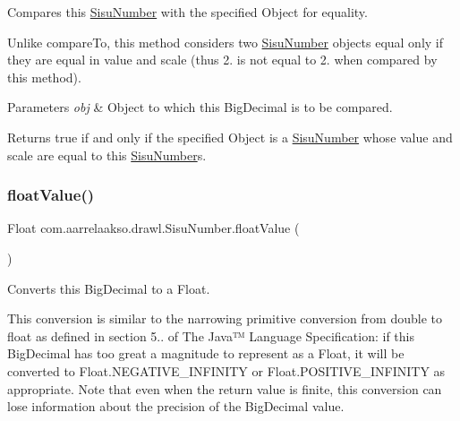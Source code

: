 Compares this \hyperlink{classcom_1_1aarrelaakso_1_1drawl_1_1_sisu_number}{Sisu\+Number} with the specified Object for equality. 

Unlike compare\+To, this method considers two \hyperlink{classcom_1_1aarrelaakso_1_1drawl_1_1_sisu_number}{Sisu\+Number} objects equal only if they are equal in value and scale (thus 2. is not equal to 2. when compared by this method).


\begin{DoxyParams}{Parameters}
{\em obj} & Object to which this Big\+Decimal is to be compared. \\
\hline
\end{DoxyParams}
\begin{DoxyReturn}{Returns}
true if and only if the specified Object is a \hyperlink{classcom_1_1aarrelaakso_1_1drawl_1_1_sisu_number}{Sisu\+Number} whose value and scale are equal to this \hyperlink{classcom_1_1aarrelaakso_1_1drawl_1_1_sisu_number}{Sisu\+Number}\textquotesingle{}s. 
\end{DoxyReturn}
\mbox{\label{classcom_1_1aarrelaakso_1_1drawl_1_1_sisu_number_a4c7db66d6d3016a3d10a1664b43117b9}} 
\subsubsection{\texorpdfstring{float\+Value()}{floatValue()}}
{\footnotesize\ttfamily Float com.\+aarrelaakso.\+drawl.\+Sisu\+Number.\+float\+Value (\begin{DoxyParamCaption}{ }\end{DoxyParamCaption})\hspace{0.3cm}{\ttfamily [protected]}}



Converts this Big\+Decimal to a Float. 

This conversion is similar to the narrowing primitive conversion from double to float as defined in section 5.. of The Java™ Language Specification\+: if this Big\+Decimal has too great a magnitude to represent as a Float, it will be converted to Float.\+N\+E\+G\+A\+T\+I\+V\+E\+\_\+\+I\+N\+F\+I\+N\+I\+TY or Float.\+P\+O\+S\+I\+T\+I\+V\+E\+\_\+\+I\+N\+F\+I\+N\+I\+TY as appropriate. Note that even when the return value is finite, this conversion can lose information about the precision of the Big\+Decimal value.

